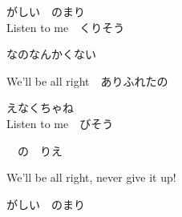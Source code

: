 {がしい　のまり
\\

Listen to me　くりそう

なのなんかくない

We'll be all right　ありふれたの

えなくちゃね
\\

Listen to me　びそう

　の　りえ

We'll be all right, never give it up!

がしい　のまり

}